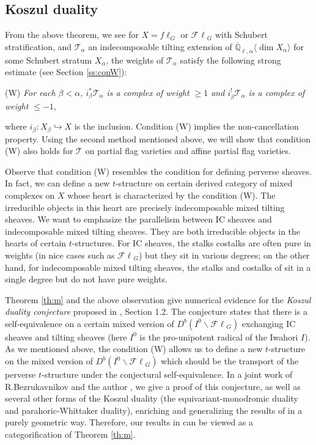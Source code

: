 \documentclass{amsart}
\theoremstyle{plain}
\theoremstyle{definition}
\theoremstyle{remark}
\numberwithin{equation}{subsection}
\begin{document}
\subsection{Koszul duality}

From the above theorem, we see for $X=f\ell_G$ or ${\mathcal{F}\ell}_G$ with Schubert stratification, and ${\mathcal{T}}_\alpha$ an indecomposable tilting extension of ${\overline{\mathbb{Q}}_{\ell,\alpha}{\langle{{\dim X_\alpha}}\rangle}}$ for some Schubert stratum $X_\alpha$, the weights of ${\mathcal{T}}_\alpha$ satisfy the following strong estimate (see Section \ref{ss:conW}):

(W) {\em For each $\beta<\alpha$, $i_\beta^*{\mathcal{T}}_\alpha$ is a complex of weight $\geq1$ and $i_\beta^!{\mathcal{T}}_\alpha$ is a complex of weight $\leq-1$},

\noindent where $i_\beta:X_\beta\hookrightarrow X$ is the inclusion. Condition (W) implies the non-cancellation property. Using the second method mentioned above, we will show that condition (W) also holds for ${\mathcal{T}}$ on partial flag varieties and affine partial flag varieties. 

Observe that condition (W) resembles the condition for defining perverse sheaves. In fact, we can define a new $t$-structure on certain derived category of mixed complexes on $X$ whose heart is characterized by the condition (W). The irreducible objects in this heart are precisely indecomposable mixed tilting sheaves. We want to emphasize the parallelism between IC sheaves and indecomposable mixed tilting sheaves. They are both irreducible objects in the hearts of certain $t$-structures. For IC sheaves, the stalks costalks are often pure in weights (in nice cases such as ${\mathcal{F}\ell}_G$) but they sit in various degrees; on the other hand, for indecomposable mixed tilting sheaves, the stalks and costalks of sit in a single degree but do not have pure weights.

Theorem \ref{th:m} and the above observation give numerical evidence for the {\em Koszul duality conjecture} proposed in \cite{B}, Section 1.2. The conjecture states that there is a self-equivalence on a certain mixed version of $D^b(I^0\backslash{\mathcal{F}\ell}_G)$ exchanging IC sheaves and tilting sheaves (here $I^0$ is the pro-unipotent radical of the Iwahori $I$). As we mentioned above, the condition (W) allows us to define a new $t$-structure on the mixed version of $D^b(I^0\backslash{\mathcal{F}\ell}_G)$ which should be the transport of the perverse $t$-structure under the conjectural self-equivalence. In a joint work of R.Bezrukavnikov and the author \cite{BY}, we give a proof of this conjecture, as well as several other forms of the Koszul duality (the equivariant-monodromic duality and parahoric-Whittaker duality), enriching and generalizing the results of \cite{BGS} in a purely geometric way. Therefore, our results in \cite{BY} can be viewed as a categorification of Theorem \ref{th:m}.
\end{document}
